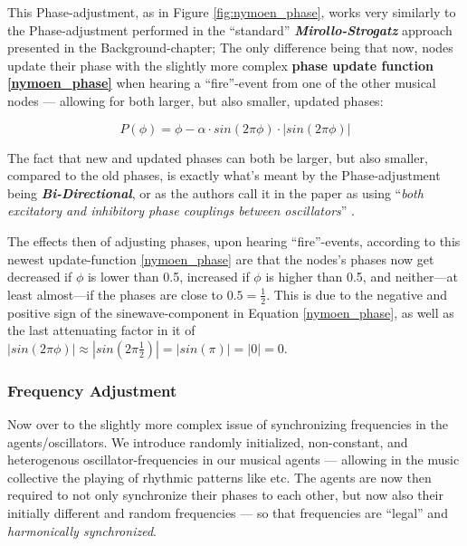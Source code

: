 			This Phase-adjustment, as in Figure \ref{fig:nymoen_phase}, works very similarly to the Phase-adjustment performed in the ``standard'' \textbf{\textit{Mirollo-Strogatz}} approach presented in the Background-chapter; The only difference being that now, nodes update their phase with the slightly more complex \textbf{phase update function \eqref{nymoen_phase}} when hearing a ``fire''-event from one of the other musical nodes — allowing for both larger, but also smaller, updated phases:
			
			\begin{equation}
			\label{nymoen_phase}
				P(\phi) = \phi - \alpha \cdot sin(2\pi\phi) \cdot | sin(2\pi\phi) |
			\end{equation}
			
			The fact that new and updated phases can both be larger, but also smaller, compared to the old phases, is exactly what's meant by the Phase-adjustment being \textbf{\textit{Bi-Directional}}, or as the authors call it in the paper as using ``\textit{both excitatory and inhibitory phase couplings between oscillators}'' \cite{nymoen_synch}.
			
			The effects then of adjusting phases, upon hearing ``fire''-events, according to this newest update-function \eqref{nymoen_phase} are that the nodes's phases now get decreased if $\phi$ is lower than 0.5, increased if $\phi$ is higher than 0.5, and neither—at least almost—if the phases are close to $0.5 = \frac{1}{2}$. This is due to the negative and positive sign of the sinewave-component in Equation \eqref{nymoen_phase}, as well as the last attenuating factor in it of $| sin(2\pi\phi) | \approx | sin(2\pi \frac{1}{2}) | = | sin(\pi) | = | 0 | = 0.$
		
		
		\subsubsection{Frequency Adjustment}
		\label{subsubsec:freq_adj}
				
			Now over to the slightly more complex issue of synchronizing frequencies in the agents/oscillators. We introduce randomly initialized, non-constant, and heterogenous oscillator-frequencies in our musical agents — allowing in the music collective the playing of rhythmic patterns like  etc. The agents are now then required to not only synchronize their phases to each other, but now also their initially different and random frequencies — so that frequencies are ``legal'' and \textit{harmonically synchronized}.
			
